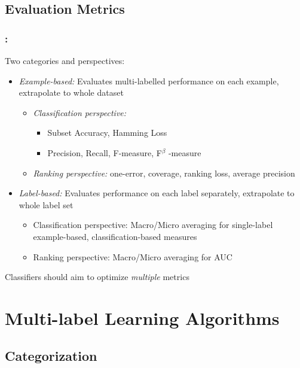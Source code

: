 \documentclass{beamer}
\begin{document}
\subsection{Evaluation Metrics}
\begin{frame}
\frametitle{\insertsection : \insertsubsection}
Two categories and perspectives:
	\begin{itemize}
		\item \emph{Example-based: }Evaluates multi-labelled performance on each example, extrapolate to whole dataset
		\begin{itemize}
			\item \emph{Classification perspective:} 
				\begin{itemize}
					\item Subset Accuracy, Hamming Loss
					\item Precision, Recall, F-measure, F$^\beta$ -measure
				\end{itemize}
			\item \emph{Ranking perspective:} one-error, coverage, ranking loss, average precision
		\end{itemize}
		\item \emph{Label-based: }Evaluates performance on each label separately, extrapolate to whole label set
		\begin{itemize}
			\item Classification perspective: Macro/Micro averaging for single-label example-based, classification-based measures
			\item Ranking perspective: Macro/Micro averaging for AUC 
		\end{itemize}
	\end{itemize}
	Classifiers should aim to optimize \emph{multiple} metrics
\end{frame}
\section{Multi-label Learning Algorithms}

\subsection{Categorization}
\end{document}
